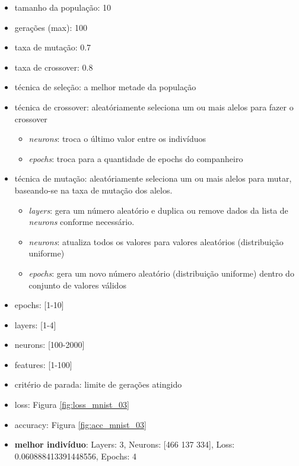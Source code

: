 \documentclass[twoside,conference,a4paper]{IEEEtran}
\begin{document}
\begin{itemize}
    \item tamanho da população: 10
    \item gerações (max): 100
    \item taxa de mutação: 0.7
    \item taxa de crossover: 0.8
    \item técnica de seleção: a melhor metade da população
    \item técnica de crossover: aleatóriamente seleciona um ou mais alelos para fazer o crossover
    \begin{itemize}
        \item \emph{neurons}: troca o último valor entre os indivíduos
        \item \emph{epochs}: troca para a quantidade de epochs do companheiro
    \end{itemize}
    \item técnica de mutação: aleatóriamente seleciona um ou mais alelos para mutar, baseando-se na taxa de mutação dos alelos.
    \begin{itemize}
        \item \emph{layers}: gera um número aleatório e duplica ou remove dados da lista de \emph{neurons} conforme necessário.
        \item \emph{neurons}: atualiza todos os valores para valores aleatórios (distribuição uniforme)
        \item \emph{epochs}: gera um novo número aleatório (distribuição uniforme) dentro do conjunto de valores válidos
    \end{itemize}
    \item epochs: [1-10]
    \item layers: [1-4]
    \item neurons: [100-2000]
    \item features: [1-100]
    \item critério de parada: limite de gerações atingido
    \item loss: Figura \ref{fig:loss_mnist_03}
    \item accuracy: Figura \ref{fig:acc_mnist_03}
    \item \textbf{melhor indivíduo}: Layers: 3, Neurons: [466 137 334], Loss: 0.060888413391448556, Epochs: 4
\end{itemize}
\end{document}
